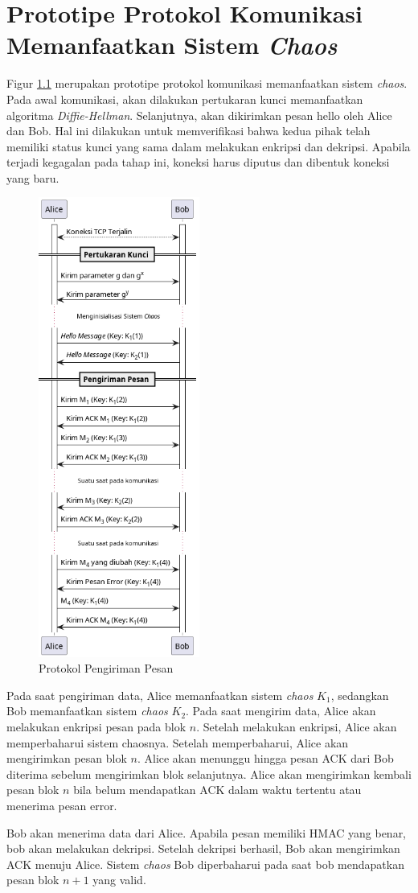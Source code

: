 \chapter{{{Prototipe Protokol Komunikasi Memanfaatkan Sistem \emph{Chaos}}}} 
\label{appendix:protokol}

Figur \ref{fig:solution.protocol} merupakan prototipe protokol komunikasi memanfaatkan sistem \emph{chaos}. Pada awal komunikasi, akan dilakukan pertukaran kunci memanfaatkan algoritma \emph{Diffie-Hellman}. Selanjutnya, akan dikirimkan pesan hello oleh Alice dan Bob. Hal ini dilakukan untuk memverifikasi bahwa kedua pihak telah memiliki status kunci yang sama dalam melakukan enkripsi dan dekripsi. Apabila terjadi kegagalan pada tahap ini, koneksi harus diputus dan dibentuk koneksi yang baru.

\begin{figure}[!h]
  \centering
  \includegraphics[width=200px]{chapters/res/chapter-3/img/protocol.png}
  \caption{Protokol Pengiriman Pesan} \label{fig:solution.protocol}
\end{figure}

Pada saat pengiriman data, Alice memanfaatkan sistem \emph{chaos} $K_1$, sedangkan Bob memanfaatkan sistem \emph{chaos} $K_2$. Pada saat mengirim data, Alice akan melakukan enkripsi pesan pada blok $n$. Setelah melakukan enkripsi, Alice akan memperbaharui sistem chaosnya. Setelah memperbaharui, Alice akan mengirimkan pesan blok $n$. Alice akan menunggu hingga pesan ACK dari Bob diterima sebelum mengirimkan blok selanjutnya. Alice akan mengirimkan kembali pesan blok $n$ bila belum mendapatkan ACK dalam waktu tertentu atau menerima pesan error.

Bob akan menerima data dari Alice. Apabila pesan memiliki HMAC yang benar, bob akan melakukan dekripsi. Setelah dekripsi berhasil, Bob akan mengirimkan ACK menuju Alice. Sistem \emph{chaos} Bob diperbaharui pada saat bob mendapatkan pesan blok $n+1$ yang valid.
